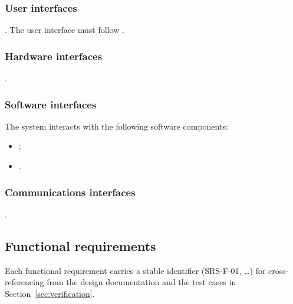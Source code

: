 \documentclass[12pt,a4paper]{extarticle}
\begin{document}
\subsubsection{User interfaces}

. The user interface must follow .

\subsubsection{Hardware interfaces}

.

\subsubsection{Software interfaces}

The system interacts with the following software components:
\begin{itemize}[leftmargin=1.25cm]
    \item {};
    \item {}.
\end{itemize}

\subsubsection{Communications interfaces}

.

\subsection{Functional requirements}
\label{sec:functional_reqs}

Each functional requirement carries a stable identifier (SRS-F-01, \dots) for cross-referencing from the design documentation and the test cases in Section~\ref{sec:verification}.
\end{document}
